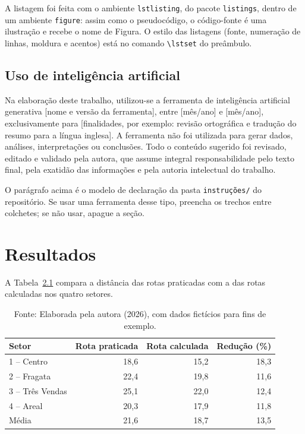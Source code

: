 \documentclass[tcc,capa]{texufpel}
\begin{document}
A listagem foi feita com o ambiente \texttt{lstlisting}, do pacote
\texttt{listings}, dentro de um ambiente \texttt{figure}: assim como o
pseudocódigo, o código-fonte é uma ilustração e recebe o nome de Figura. O
estilo das listagens (fonte, numeração de linhas, moldura e acentos) está no
comando \verb|\lstset| do preâmbulo.

\section{Uso de inteligência artificial}

Na elaboração deste trabalho, utilizou-se a ferramenta de inteligência
artificial generativa [nome e versão da ferramenta], entre [mês/ano] e
[mês/ano], exclusivamente para [finalidades, por exemplo: revisão ortográfica
e tradução do resumo para a língua inglesa]. A ferramenta não foi utilizada
para gerar dados, análises, interpretações ou conclusões. Todo o conteúdo
sugerido foi revisado, editado e validado pela autora, que assume integral
responsabilidade pelo texto final, pela exatidão das informações e pela
autoria intelectual do trabalho.

O parágrafo acima é o modelo de declaração da pasta \texttt{instruções/} do
repositório. Se usar uma ferramenta desse tipo, preencha os trechos entre
colchetes; se não usar, apague a seção.

\chapter{Resultados}
\label{cap:resultados}

A Tabela~\ref{tab:resultados} compara a distância das rotas praticadas com a
das rotas calculadas nos quatro setores.

\begin{table}[htbp]
  \caption{Distância percorrida por setor, em quilômetros}
  \label{tab:resultados}
  \centering
  \begin{tabular}{lrrr}
    \hline
    Setor & Rota praticada & Rota calculada & Redução (\%) \\
    \hline
    1 -- Centro      & 18,6 & 15,2 & 18,3 \\
    2 -- Fragata     & 22,4 & 19,8 & 11,6 \\
    3 -- Três Vendas & 25,1 & 22,0 & 12,4 \\
    4 -- Areal       & 20,3 & 17,9 & 11,8 \\
    \hline
    Média            & 21,6 & 18,7 & 13,5 \\
    \hline
  \end{tabular}
  \caption*{Fonte: Elaborada pela autora (2026), com dados fictícios para fins de exemplo.}
\end{table}
\end{document}
